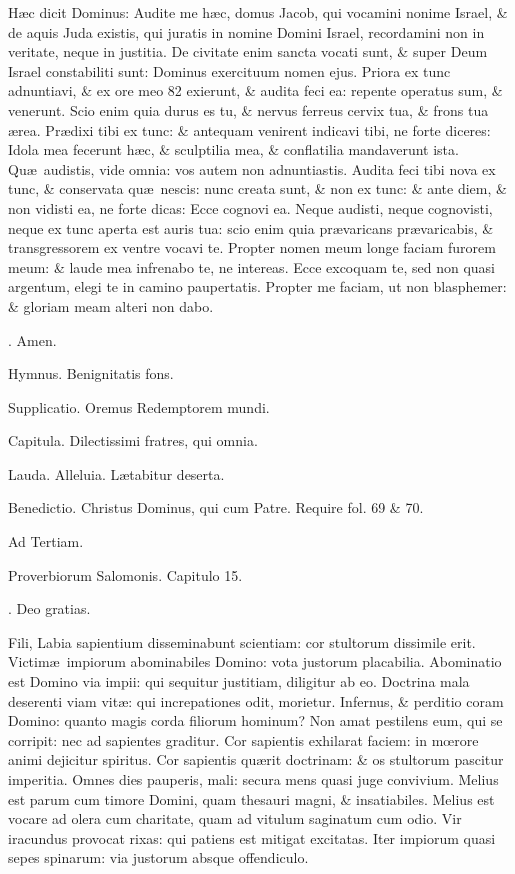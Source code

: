 \documentclass[letter,11pt]{book}
\makeatletter
\DeclareRobustCommand{\Rbar}{\vers@resp{0pt}{R}}
\newcommand{\vers@resp@sym}{\raisebox{0.2ex}{\rotatebox[origin=c]{-20}{$\m@th\rceil$}}}
\newcommand{\vers@resp}[2]{%
  {\ooalign{\hidewidth\kern#1\vers@resp@sym\hidewidth\cr#2\cr}}%
}%
\def\R{\color{Red} \Rbar . \color{black}}
\makeatother
\begin{document}
\begin{multicols*}{2}
H\ae c dicit Dominus: Audite me h\ae c, domus Jacob, qui vocamini nonime Israel, \& de aquis Juda existis, qui juratis in nomine Domini Israel, recordamini non in veritate, neque in justitia. De civitate enim sancta vocati sunt, \& super Deum Israel constabiliti sunt: Dominus exercituum nomen ejus. Priora ex tunc adnuntiavi, \& ex ore meo 82 exierunt, \& audita feci ea: repente operatus sum, \& venerunt. Scio enim quia durus es tu, \& nervus ferreus cervix tua, \& frons tua \ae rea. Pr\ae dixi tibi ex tunc: \& antequam venirent indicavi tibi, ne forte diceres: Idola mea fecerunt h\ae c, \& sculptilia mea, \& conflatilia mandaverunt ista. Qu\ae \ audistis, vide omnia: vos autem non adnuntiastis. Audita feci tibi nova ex tunc, \& conservata qu\ae \ nescis: nunc creata sunt, \& non ex tunc: \& ante diem, \& non vidisti ea, ne forte dicas: Ecce cognovi ea. Neque audisti, neque cognovisti, neque ex tunc aperta est auris tua: scio enim quia pr\ae varicans pr\ae varicabis, \& transgressorem ex ventre vocavi te. Propter nomen meum longe faciam furorem meum: \& laude mea infrenabo te, ne intereas. Ecce excoquam te, sed non quasi argentum, elegi te in camino paupertatis. Propter me faciam, ut non blasphemer: \& gloriam meam alteri non dabo.

\R Amen.

Hymnus. Benignitatis fons.

Supplicatio. Oremus Redemptorem mundi.

Capitula. Dilectissimi fratres, qui omnia.

Lauda. Alleluia. L\ae tabitur deserta.

Benedictio. Christus Dominus, qui cum Patre. Require fol. 69 \& 70.

Ad Tertiam.

Proverbiorum Salomonis. Capitulo 15.

\R Deo gratias.

Fili, Labia sapientium disseminabunt scientiam: cor stultorum dissimile erit. Victim\ae \ impiorum abominabiles Domino: vota justorum placabilia. Abominatio est Domino via impii: qui sequitur justitiam, diligitur ab eo. Doctrina mala deserenti viam vit\ae : qui increpationes odit, morietur. Infernus, \& perditio coram Domino: quanto magis corda filiorum hominum? Non amat pestilens eum, qui se corripit: nec ad sapientes graditur. Cor sapientis exhilarat faciem: in m\oe rore animi dejicitur spiritus. Cor sapientis qu\ae rit doctrinam: \& os stultorum pascitur imperitia. Omnes dies pauperis, mali: secura mens quasi juge convivium. Melius est parum cum timore Domini, quam thesauri magni, \& insatiabiles. Melius est vocare ad olera cum charitate, quam ad vitulum saginatum cum odio. Vir iracundus provocat rixas: qui patiens est mitigat excitatas. Iter impiorum quasi sepes spinarum: via justorum absque offendiculo.


\end{multicols*}
\end{document}
